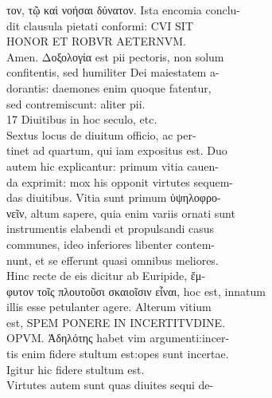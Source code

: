 \documentclass{article}
\begin{document}
\begin{pages}
                τον, τῷ καὶ νοήσαι δύνατον. Ista encomia conclu- \\
                dit clausula pietati conformi: CVI SIT \\
                HONOR ET ROBVR AETERNVM. \\
                Amen. Δοξολογία est pii pectoris, non solum \\
                confitentis, sed humiliter Dei maiestatem a- \\
                dorantis: daemones enim quoque fatentur, \\
                sed contremiscunt: aliter pii. \\
                17 Diuitibus in hoc seculo, etc. \\
                Sextus locus de diuitum officio, ac per- \\
                tinet ad quartum, qui iam expositus est. Duo \\
                autem hic explicantur: primum vitia cauen- \\
                da exprimit: mox his opponit virtutes sequem- \\
                das diuitibus. Vitia sunt primum ὑψηλοφρο- \\
                νεῖν, altum sapere, quia enim variis ornati sunt \\
                instrumentis elabendi et propulsandi casus \\
                communes, ideo inferiores libenter contem- \\
                nunt, et se efferunt quasi omnibus meliores. \\
                Hinc recte de eis dicitur ab Euripide, ἔμ- \\
                φυτον τοῖς πλουτοῦσι σκαιοῖσιν εἶναι, hoc est, innatum \\
                illis esse petulanter agere. Alterum vitium \\
                est, SPEM PONERE IN INCERTITVDINE. \\
                OPVM. Ἀδηλότης  habet vim argumenti:incer- \\
                tis enim fidere stultum est:opes sunt incertae. \\
                Igitur hic fidere stultum est. \\
                Virtutes autem sunt quas diuites sequi de- \\

\end{pages}
\end{document}
